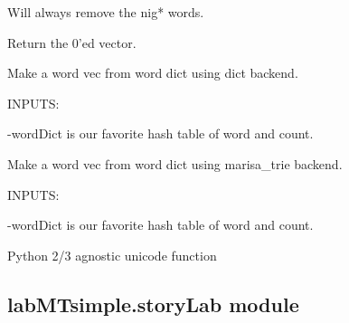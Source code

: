 \begin{fulllineitems}
\begin{fulllineitems}
Will always remove the nig* words.

Return the 0'ed vector.

\end{fulllineitems}


\begin{fulllineitems}
\label{labMTsimple:labMTsimple.speedy.sentiDict.wordVecifyTrieDict}
Make a word vec from word dict using dict backend.

INPUTS:

-wordDict is our favorite hash table of word and count.

\end{fulllineitems}


\begin{fulllineitems}
\label{labMTsimple:labMTsimple.speedy.sentiDict.wordVecifyTrieMarisa}
Make a word vec from word dict using marisa\_trie backend.

INPUTS:

-wordDict is our favorite hash table of word and count.

\end{fulllineitems}


\end{fulllineitems}


\begin{fulllineitems}
\label{labMTsimple:labMTsimple.speedy.u}
Python 2/3 agnostic unicode function

\end{fulllineitems}



\subsection{labMTsimple.storyLab module}
\label{labMTsimple:module-labMTsimple.storyLab}\label{labMTsimple:labmtsimple-storylab-module}

